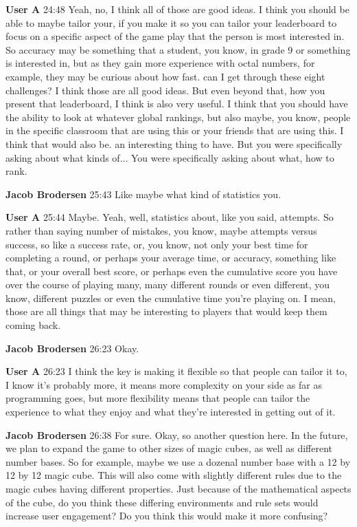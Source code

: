 \documentclass{article}
\begin{document}
\noindent \textbf{User A}   24:48
Yeah, no, I think all of those are good ideas. I think you should be able to maybe tailor your, if you make it so you can tailor your leaderboard to focus on a specific aspect of the game play that the person is most interested in. So accuracy may be something that a student, you know, in grade 9 or something is interested in, but as they gain more experience with octal numbers, for example, they may be curious about how fast.
can I get through these eight challenges? I think those are all good ideas. But even beyond that, how you present that leaderboard, I think is also very useful. I think that you should have the ability to look at whatever global rankings, but also maybe, you know, people in the specific classroom that are using this or your friends that are using this. I think that would also be.
an interesting thing to have. But you were specifically asking about what kinds of...
You were specifically asking about what, how to rank.

\noindent \textbf{Jacob Brodersen}   25:43
Like maybe what kind of statistics you.

\noindent \textbf{User A}   25:44
Maybe.
Yeah, well, statistics about, like you said, attempts. So rather than saying number of mistakes, you know, maybe attempts versus success, so like a success rate, or, you know, not only your best time for completing a round, or perhaps your average time, or accuracy, something like that, or your overall best score, or perhaps even the cumulative score you have over the course of
playing many, many different rounds or even different, you know, different puzzles or even the cumulative time you're playing on. I mean, those are all things that may be interesting to players that would keep them coming back.

\noindent \textbf{Jacob Brodersen}   26:23
Okay.

\noindent \textbf{User A}   26:23
I think the key is making it flexible so that people can tailor it to, I know it's probably more, it means more complexity on your side as far as programming goes, but more flexibility means that people can tailor the experience to what they enjoy and what they're interested in getting out of it.

\noindent \textbf{Jacob Brodersen}   26:38
For sure.
Okay, so another question here. In the future, we plan to expand the game to other sizes of magic cubes, as well as different number bases. So for example, maybe we use a dozenal number base with a 12 by 12 by 12 magic cube. This will also come with slightly different rules due to the magic cubes having different properties.
Just because of the mathematical aspects of the cube, do you think these differing environments and rule sets would increase user engagement? Do you think this would make it more confusing?
\end{document}
